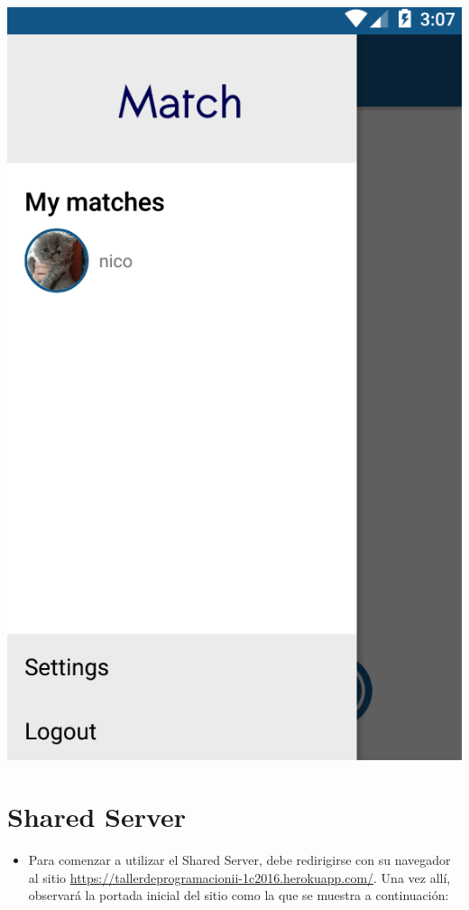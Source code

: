 \documentclass[letterpaper,10pt,english]{sphinxmanual}
\begin{document}
\includegraphics{matches.png}


\section{Shared Server}
\label{manuals:shared-server}\begin{itemize}
\item {} 
Para comenzar a utilizar el Shared Server, debe redirigirse con su navegador al sitio \href{https://tallerdeprogramacionii-1c2016.herokuapp.com/}{https://tallerdeprogramacionii-1c2016.herokuapp.com/}. Una vez allí, observará la portada inicial del sitio como la que se muestra a continuación:

\end{itemize}
\end{document}

